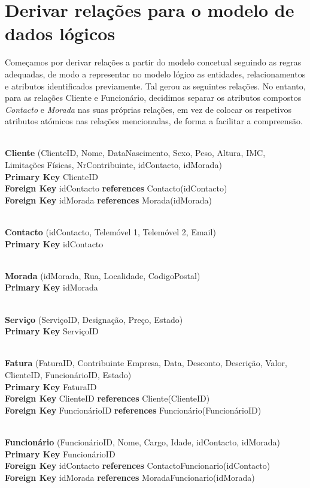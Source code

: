 \section{Derivar relações para o modelo de dados lógicos}

Começamos por derivar relações a partir do modelo concetual seguindo as regras adequadas, de modo a representar no modelo lógico as entidades, relacionamentos e atributos identificados previamente. Tal gerou as seguintes relações. No entanto, para as relações Cliente e Funcionário, decidimos separar os atributos compostos \emph{Contacto} e \emph{Morada} nas suas próprias relações, em vez de colocar os respetivos atributos atómicos nas relações mencionadas, de forma a facilitar a compreensão.


\noindent
\\\textbf{Cliente} (ClienteID,  Nome, DataNascimento, Sexo, Peso, Altura, IMC, Limitações Físicas,  NrContribuinte, idContacto, idMorada)
\\\textbf{Primary Key} ClienteID
\\\textbf{Foreign Key} idContacto \textbf{references} Contacto(idContacto)
\\\textbf{Foreign Key} idMorada \textbf{references} Morada(idMorada)

\noindent
\\\textbf{Contacto} (idContacto, Telemóvel 1, Telemóvel 2, Email)
\\\textbf{Primary Key} idContacto

\noindent
\\\textbf{Morada} (idMorada, Rua, Localidade, CodigoPostal)
\\\textbf{Primary Key} idMorada

\noindent
\\\textbf{Serviço} (ServiçoID, Designação, Preço, Estado)
\\\textbf{Primary Key} ServiçoID

\noindent
\\\textbf{Fatura} (FaturaID, Contribuinte Empresa, Data, Desconto, Descrição, Valor, ClienteID, FuncionárioID, Estado)
\\\textbf{Primary Key} FaturaID
\\\textbf{Foreign Key} ClienteID \textbf{references} Cliente(ClienteID)
\\\textbf{Foreign Key} FuncionárioID \textbf{references} Funcionário(FuncionárioID)

\noindent
\\\textbf{Funcionário} (FuncionárioID, Nome, Cargo, Idade, idContacto, idMorada)
\\\textbf{Primary Key} FuncionárioID
\\\textbf{Foreign Key} idContacto \textbf{references} ContactoFuncionario(idContacto)
\\\textbf{Foreign Key} idMorada \textbf{references} MoradaFuncionario(idMorada)

